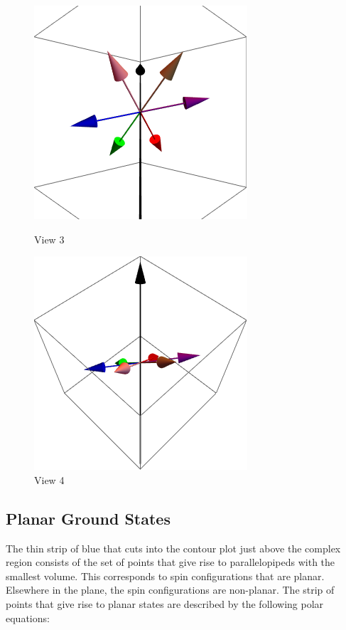 \begin{figure}
\begin{minipage}[b]{0.5\linewidth}
  \end{minipage} 
  \begin{minipage}[b]{0.5\linewidth}
    \centering
    \includegraphics[width=.5\linewidth]{img/th2-3108_phi0-27_view3.png} 
    \caption{View 3} 
    \vspace{4ex}
  \end{minipage}%
  \begin{minipage}[b]{0.5\linewidth}
    \centering
    \includegraphics[width=.5\linewidth]{img/th2-3108_phi0-27_view4.png} 
    \caption{View 4} 
    \vspace{4ex}
  \end{minipage} 
\end{figure}

\clearpage
\subsection{Planar Ground States}

The thin strip of blue that cuts into the contour plot just above the complex region consists of the set of points that give rise to parallelopipeds with the smallest volume. This corresponds to spin configurations that are planar. Elsewhere in the plane, the spin configurations are non-planar. The strip of points that give rise to planar states are described by the following polar equations:

